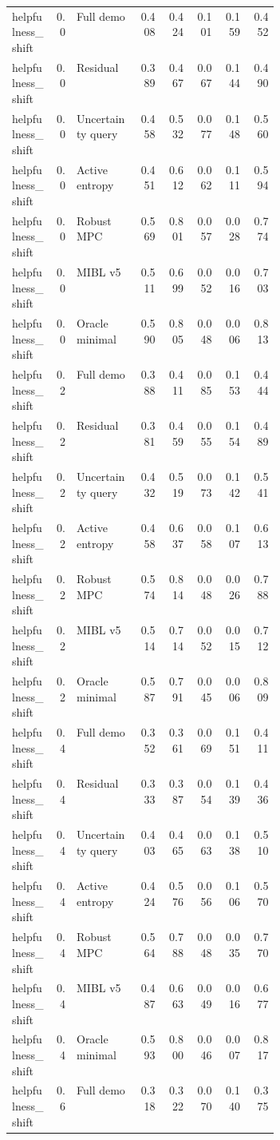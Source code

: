 \documentclass{article}
\begin{document}
\begin{center}
\begin{longtable}{p{0.16\linewidth}rp{0.23\linewidth}rrrrr}
helpfulness\_shift & 0.0 & Full demo & 0.408 & 0.424 & 0.101 & 0.159 & 0.452\\
helpfulness\_shift & 0.0 & Residual & 0.389 & 0.467 & 0.067 & 0.144 & 0.490\\
helpfulness\_shift & 0.0 & Uncertainty query & 0.458 & 0.532 & 0.077 & 0.148 & 0.560\\
helpfulness\_shift & 0.0 & Active entropy & 0.451 & 0.612 & 0.062 & 0.111 & 0.594\\
helpfulness\_shift & 0.0 & Robust MPC & 0.569 & 0.801 & 0.057 & 0.028 & 0.774\\
helpfulness\_shift & 0.0 & MIBL v5 & 0.511 & 0.699 & 0.052 & 0.016 & 0.703\\
helpfulness\_shift & 0.0 & Oracle minimal & 0.590 & 0.805 & 0.048 & 0.006 & 0.813\\
helpfulness\_shift & 0.2 & Full demo & 0.388 & 0.411 & 0.085 & 0.153 & 0.444\\
helpfulness\_shift & 0.2 & Residual & 0.381 & 0.459 & 0.055 & 0.154 & 0.489\\
helpfulness\_shift & 0.2 & Uncertainty query & 0.432 & 0.519 & 0.073 & 0.142 & 0.541\\
helpfulness\_shift & 0.2 & Active entropy & 0.458 & 0.637 & 0.058 & 0.107 & 0.613\\
helpfulness\_shift & 0.2 & Robust MPC & 0.574 & 0.814 & 0.048 & 0.026 & 0.788\\
helpfulness\_shift & 0.2 & MIBL v5 & 0.514 & 0.714 & 0.052 & 0.015 & 0.712\\
helpfulness\_shift & 0.2 & Oracle minimal & 0.587 & 0.791 & 0.045 & 0.006 & 0.809\\
helpfulness\_shift & 0.4 & Full demo & 0.352 & 0.361 & 0.069 & 0.151 & 0.411\\
helpfulness\_shift & 0.4 & Residual & 0.333 & 0.387 & 0.054 & 0.139 & 0.436\\
helpfulness\_shift & 0.4 & Uncertainty query & 0.403 & 0.465 & 0.063 & 0.138 & 0.510\\
helpfulness\_shift & 0.4 & Active entropy & 0.424 & 0.576 & 0.056 & 0.106 & 0.570\\
helpfulness\_shift & 0.4 & Robust MPC & 0.564 & 0.788 & 0.048 & 0.035 & 0.770\\
helpfulness\_shift & 0.4 & MIBL v5 & 0.487 & 0.663 & 0.049 & 0.016 & 0.677\\
helpfulness\_shift & 0.4 & Oracle minimal & 0.593 & 0.800 & 0.046 & 0.007 & 0.817\\
helpfulness\_shift & 0.6 & Full demo & 0.318 & 0.322 & 0.070 & 0.140 & 0.375\\

\end{longtable}
\end{center}
\end{document}
